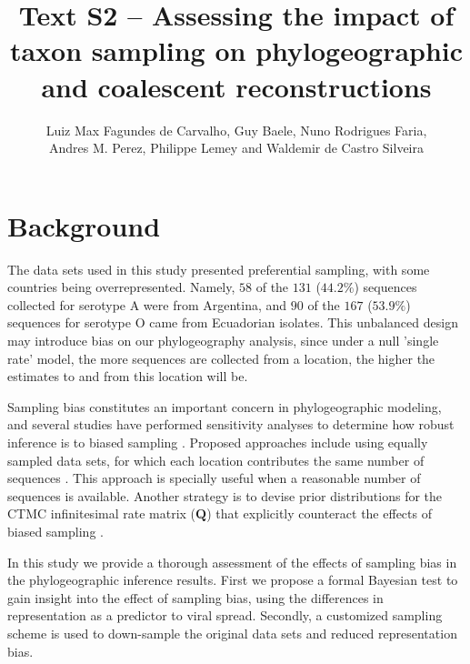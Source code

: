 \documentclass[a4paper,10pt]{article}
\title{Text S2 -- Assessing the impact of taxon sampling on phylogeographic and coalescent reconstructions} %
\author{
Luiz Max Fagundes de Carvalho,
Guy Baele,
Nuno Rodrigues Faria,\\
Andres M. Perez,
Philippe Lemey and
Waldemir de Castro Silveira
\\}
\date{}
\begin{document}
\maketitle

\section{Background}

The data sets used in this study presented preferential sampling, with some countries being overrepresented.
Namely, $58$ of the $131$ ($44.2\%$) sequences collected for serotype A were from Argentina, and $90$ of the $167$ ($53.9\%$) sequences for serotype O came from Ecuadorian isolates.
This unbalanced design may introduce bias on our phylogeography analysis, since under a null 'single rate' model, the more sequences are collected from a location, the higher the estimates to and from this location will be. %

Sampling bias constitutes an important concern in phylogeographic modeling, and several studies have performed sensitivity analyses to determine how robust inference is to biased sampling \cite{M-Faria2012,M-Lemey2013,M-polar,M-fluPNAS}.
Proposed approaches include using equally sampled data sets, for which each location contributes the same number of sequences \cite{M-fluPNAS}.
This approach is specially useful when a reasonable number of sequences is available.
Another strategy is to devise prior distributions for the CTMC infinitesimal rate matrix ($\mathbf{Q}$) that explicitly counteract the effects of biased sampling \cite{M-Faria2012}.


In this study we provide a thorough assessment of the effects of sampling bias in the phylogeographic inference results. 
First we propose a formal Bayesian test to gain insight into the effect of sampling bias, using the differences in representation as a predictor to viral spread.
Secondly, a customized sampling scheme is used to down-sample the original data sets and reduced representation bias.
\end{document}
